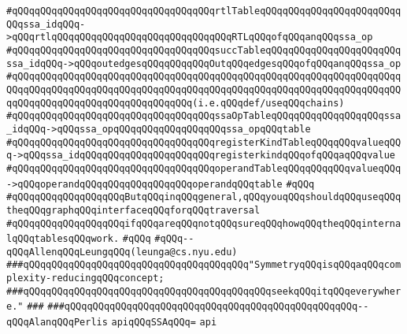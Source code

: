 \verb|#qQQqqQQqqQQqqQQqqQQqqQQqqQQqqQQqqQQqrtlTableqQQqqQQqqQQqqQQqqQQqqQQqqQQqssa_idqQQq->qQQqrtlqQQqqQQqqQQqqQQqqQQqqQQqqQQqqQQqRTLqQQqofqQQqanqQQqssa_op|\newline
\verb|#qQQqqQQqqQQqqQQqqQQqqQQqqQQqqQQqqQQqsuccTableqQQqqQQqqQQqqQQqqQQqqQQqssa_idqQQq->qQQqoutedgesqQQqqQQqqQQqOutqQQqedgesqQQqofqQQqanqQQqssa_op|\newline
\verb|#qQQqqQQqqQQqqQQqqQQqqQQqqQQqqQQqqQQqqQQqqQQqqQQqqQQqqQQqqQQqqQQqqQQqqQQqqQQqqQQqqQQqqQQqqQQqqQQqqQQqqQQqqQQqqQQqqQQqqQQqqQQqqQQqqQQqqQQqqQQqqQQqqQQqqQQqqQQqqQQqqQQqqQQqqQQq(i.e.qQQqdef/useqQQqchains)|\newline
\verb|#qQQqqQQqqQQqqQQqqQQqqQQqqQQqqQQqqQQqssaOpTableqQQqqQQqqQQqqQQqqQQqssa_idqQQq->qQQqssa_opqQQqqQQqqQQqqQQqqQQqssa_opqQQqtable|\newline
\verb|#qQQqqQQqqQQqqQQqqQQqqQQqqQQqqQQqqQQqregisterKindTableqQQqqQQqvalueqQQq->qQQqssa_idqQQqqQQqqQQqqQQqqQQqqQQqregisterkindqQQqofqQQqaqQQqvalue|\newline
\verb|#qQQqqQQqqQQqqQQqqQQqqQQqqQQqqQQqqQQqoperandTableqQQqqQQqqQQqvalueqQQq->qQQqoperandqQQqqQQqqQQqqQQqqQQqoperandqQQqtable|\newline
\verb|#qQQq|\newline
\verb|#qQQqqQQqqQQqqQQqqQQqButqQQqinqQQqgeneral,qQQqyouqQQqshouldqQQquseqQQqtheqQQqgraphqQQqinterfaceqQQqforqQQqtraversal|\newline
\verb|#qQQqqQQqqQQqqQQqqQQqifqQQqareqQQqnotqQQqsureqQQqhowqQQqtheqQQqinternalqQQqtablesqQQqwork.|\newline
\verb|#qQQq|\newline
\verb|#qQQq--qQQqAllenqQQqLeungqQQq(leunga@cs.nyu.edu)|\newline
\newline
\newline
\newline
\verb|###qQQqqQQqqQQqqQQqqQQqqQQqqQQqqQQqqQQqqQQq"SymmetryqQQqisqQQqaqQQqcomplexity-reducingqQQqconcept;|\newline
\verb|###qQQqqQQqqQQqqQQqqQQqqQQqqQQqqQQqqQQqqQQqqQQqseekqQQqitqQQqeverywhere."|\newline
\verb|###|\newline
\verb|###qQQqqQQqqQQqqQQqqQQqqQQqqQQqqQQqqQQqqQQqqQQqqQQqqQQq--qQQqAlanqQQqPerlis|\newline
\newline
\newline
\verb|apiqQQqSSAqQQq=|\newline
\verb|api|\newline
\newline
